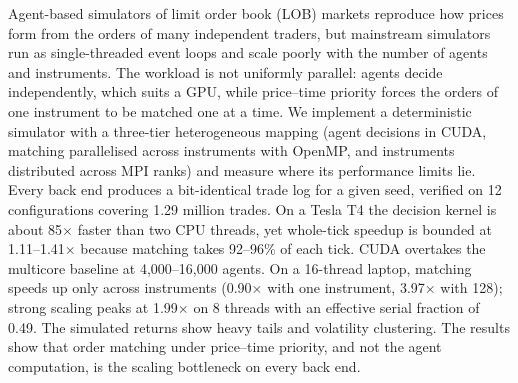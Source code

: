 Agent-based simulators of limit order book (LOB) markets reproduce how prices form from the orders
of many independent traders, but mainstream simulators run as single-threaded event loops and scale
poorly with the number of agents and instruments. The workload is not uniformly parallel: agents
decide independently, which suits a GPU, while price--time priority forces the orders of one
instrument to be matched one at a time. We implement a deterministic simulator with a three-tier
heterogeneous mapping (agent decisions in CUDA, matching parallelised across instruments with
OpenMP, and instruments distributed across MPI ranks) and measure where its performance limits lie.
Every back end produces a bit-identical trade log for a given seed, verified on 12 configurations
covering 1.29 million trades. On a Tesla T4 the decision kernel is about 85$\times$ faster than
two CPU threads, yet whole-tick speedup is bounded at 1.11--1.41$\times$ because matching takes
92--96\% of each tick. CUDA overtakes the multicore baseline at 4{,}000--16{,}000 agents. On a
16-thread laptop, matching speeds up only across instruments (0.90$\times$ with one instrument,
3.97$\times$ with 128); strong scaling peaks at 1.99$\times$ on 8 threads with an effective serial
fraction of 0.49. The simulated returns show heavy tails and volatility clustering. The results
show that order matching under price--time priority, and not the agent computation, is the scaling
bottleneck on every back end.
